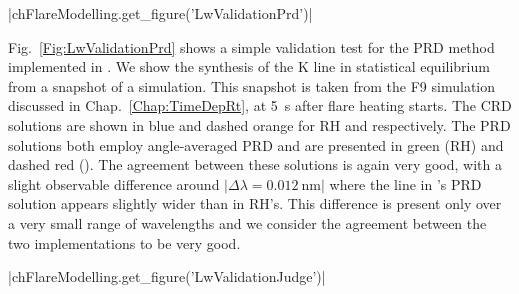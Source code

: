 \py[FlareModelling]|chFlareModelling.get_figure('LwValidationPrd')|

Fig.~\ref{Fig:LwValidationPrd} shows a simple validation test for the PRD method implemented in \Lw{}.
We show the synthesis of the \Caii{} K line in statistical equilibrium from a snapshot of a \Radyn{} simulation.
This snapshot is taken from the F9 simulation discussed in Chap.~\ref{Chap:TimeDepRt}, at \SI{5}{\second} after flare heating starts.
The CRD solutions are shown in blue and dashed orange for RH and \Lw{} respectively.
The PRD solutions both employ angle-averaged PRD and are presented in green (RH) and dashed red (\Lw{}).
The agreement between these solutions is again very good, with a slight observable difference around $|\Delta\lambda=\SI{0.012}{\nano\metre}|$ where the line in \Lw{}'s PRD solution appears slightly wider than in RH's.
This difference is present only over a very small range of wavelengths and we consider the agreement between the two implementations to be very good.

\py[FlareModelling]|chFlareModelling.get_figure('LwValidationJudge')|

